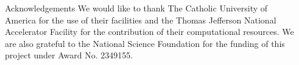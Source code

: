 \documentclass[final]{beamer}
\newlength{\sepwidth}
\newlength{\colwidth}
\newcommand{\separatorcolumn}{\begin{column}{\sepwidth}\end{column}}
\begin{document}
\begin{frame}[t]
\begin{columns}[t]
\begin{column}{\colwidth}
\vspace{-1.25cm}
  \begin{block}{Acknowledgements}
\small We would like to thank The Catholic University of America for the use of their facilities and the Thomas Jefferson National Accelerator Facility for the contribution of their computational resources. We are also grateful to the National Science Foundation for the funding of this project under Award No. 2349155. 

  \end{block}

\end{column}

\separatorcolumn
\end{columns}
\end{frame}
\end{document}
